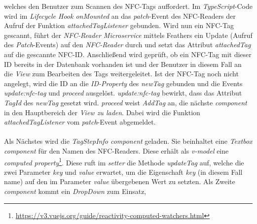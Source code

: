 \documentclass[10pt, a4paper]{article}
\begin{document}
\begin{onehalfspace}
welches den Benutzer zum Scannen des NFC-Tags auffordert. Im \textit{TypeScript}-Code wird im \textit{Lifecycle Hook onMounted} an das \textit{patch}-Event des
NFC-Readers der Aufruf der Funktion \textit{attachedTagListener} gebunden. Wird nun ein NFC-Tag gescannt, führt der \textit{NFC-Reader Microservice} mittels Feathers ein Update (Aufruf des \textit{Patch}-Events) auf den \textit{NFC-Reader} durch und setzt das Attribut \textit{attachedTag} auf die gescannte NFC-ID.
Anschließend wird geprüft, ob ein NFC-Tag mit dieser ID bereits in der Datenbank vorhanden ist und der Benutzer in diesem Fall an die \textit{View} zum Bearbeiten des Tags weitergeleitet.
Ist der NFC-Tag noch nicht angelegt, wird die ID an die \textit{ID-Property} des \textit{newTag} gebunden und die Events \textit{update:nfc-tag} und \textit{proceed} ausgelöst.
\textit{update:nfc-tag} bewirkt, dass das Attribut \textit{TagId} des \textit{newTag} gesetzt wird.
\textit{proceed} weist \textit{AddTag} an, die nächste \textit{component} in den Hauptbereich der \textit{View zu laden}.
Dabei wird die Funktion \textit{attachedTagListener} vom \textit{patch}-Event abgemeldet.
\\~\\
Als Nächstes wird die \textit{TagStepInfo component} geladen.
Sie beinhaltet eine \textit{Textbox component} für den Namen des NFC-Readers.
Diese erhält als \textit{v-model} eine \textit{computed property}\footnote{\url{https://v3.vuejs.org/guide/reactivity-computed-watchers.html}}.
Diese ruft im \textit{setter} die Methode \textit{updateTag} auf, welche die zwei Parameter \textit{key} und \textit{value} erwartet, um die Eigenschaft \textit{key} (in diesem Fall \glqq name\grqq{}) auf den im Parameter \textit{value} übergebenen Wert zu setzten.
Als Zweite \textit{component} kommt ein \textit{DropDown} zum Einsatz,

\end{onehalfspace}
\end{document}
